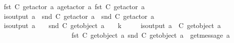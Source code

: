 \begin{isabellebody}
\ \ \ \ \ {\isachardoublequoteopen}fst\ {\isacharparenleft}{\kern0pt}C{}\ {\isacharparenleft}{\kern0pt}get{\isacharunderscore}{\kern0pt}actor\ a{\isacharparenright}{\kern0pt}{\isacharparenright}{\kern0pt}\ {\isasymmidarrow}a{\isasymrightarrow}{\isacharparenleft}{\kern0pt}get{\isacharunderscore}{\kern0pt}actor\ a{\isacharparenright}{\kern0pt}\ {\isacharparenleft}{\kern0pt}fst\ {\isacharparenleft}{\kern0pt}C{}\ {\isacharparenleft}{\kern0pt}get{\isacharunderscore}{\kern0pt}actor\ a{\isacharparenright}{\kern0pt}{\isacharparenright}{\kern0pt}{\isacharparenright}{\kern0pt}{\isachardoublequoteclose}\isanewline
\ \ \ \ \ {\isachardoublequoteopen}is{\isacharunderscore}{\kern0pt}output\ a\ {\isasymLongrightarrow}\ snd\ {\isacharparenleft}{\kern0pt}C{}\ {\isacharparenleft}{\kern0pt}get{\isacharunderscore}{\kern0pt}actor\ a{\isacharparenright}{\kern0pt}{\isacharparenright}{\kern0pt}\ {\isacharequal}{\kern0pt}\ snd\ {\isacharparenleft}{\kern0pt}C{}\ {\isacharparenleft}{\kern0pt}get{\isacharunderscore}{\kern0pt}actor\ a{\isacharparenright}{\kern0pt}{\isacharparenright}{\kern0pt}{\isachardoublequoteclose}\isanewline
\ \ \ \ \ {\isachardoublequoteopen}is{\isacharunderscore}{\kern0pt}output\ a\ {\isasymLongrightarrow}\ {\isacharparenleft}{\kern0pt}\ {\isacharbar}{\kern0pt}\ {\isacharparenleft}{\kern0pt}snd\ {\isacharparenleft}{\kern0pt}C{}\ {\isacharparenleft}{\kern0pt}get{\isacharunderscore}{\kern0pt}object\ a{\isacharparenright}{\kern0pt}{\isacharparenright}{\kern0pt}{\isacharparenright}{\kern0pt}\ {\isacharbar}{\kern0pt}\ {\isacharparenright}{\kern0pt}\ {\isacharless}{\kern0pt}\isactrlsub {\isasymB}\ k{\isachardoublequoteclose}\isanewline
\ \ \ \ \ {\isachardoublequoteopen}is{\isacharunderscore}{\kern0pt}output\ a\ {\isasymLongrightarrow}\ C{}\ {\isacharparenleft}{\kern0pt}get{\isacharunderscore}{\kern0pt}object\ a{\isacharparenright}{\kern0pt}\ {\isacharequal}{\kern0pt}\isanewline
\ \ \ \ \ \ \ \ \ \ \ \ \ \ \ \ \ \ \ \ \ \ \ \ \ {\isacharparenleft}{\kern0pt}fst\ {\isacharparenleft}{\kern0pt}C{}\ {\isacharparenleft}{\kern0pt}get{\isacharunderscore}{\kern0pt}object\ a{\isacharparenright}{\kern0pt}{\isacharparenright}{\kern0pt}{\isacharcomma}{\kern0pt}\ {\isacharparenleft}{\kern0pt}snd\ {\isacharparenleft}{\kern0pt}C{}\ {\isacharparenleft}{\kern0pt}get{\isacharunderscore}{\kern0pt}object\ a{\isacharparenright}{\kern0pt}{\isacharparenright}{\kern0pt}{\isacharparenright}{\kern0pt}\ {\isasymcdot}\ {\isacharbrackleft}{\kern0pt}get{\isacharunderscore}{\kern0pt}message\ a{\isacharbrackright}{\kern0pt}{\isacharparenright}{\kern0pt}{\isachardoublequoteclose}\isanewline

\end{isabellebody}
